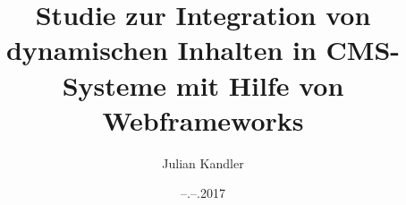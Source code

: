 \title{Studie zur Integration von dynamischen Inhalten in CMS-Systeme mit Hilfe von Webframeworks}
\author{Julian Kandler}
\date{--.--.2017}
\subject{Masterarbeit}